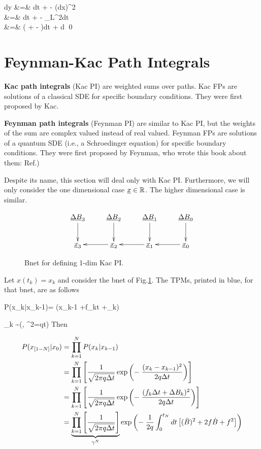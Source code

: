 \beqa
dy &=& dt + 
-\;
(dx)^2
\\
&=&
 dt + 
-\;
_{L^2dt}
\\
&=&
\left(
 +  -
\right)dt + d\rvB
\eeqa
\qed





\section{Feynman-Kac Path Integrals}

{\bf Kac path integrals} (Kac PI)
are weighted sums  over paths. Kac FPs
are solutions of a classical SDE for specific boundary conditions. They were first proposed by Kac.

{\bf Feynman path integrals} (Feynman PI) are similar to Kac PI,
but the weights of the sum are complex valued instead of real valued. Feynman FPs
are solutions of a quantum SDE (i.e., a Schroedinger equation) for specific boundary conditions. They
were first proposed by Feynman,
who  wrote this book
about them: Ref.\cite{feynman-hibbs})

Despite its name,
this section will
deal only with  Kac PI.
Furthermore, we will only
consider the
one dimensional case $\rvx\in\RR$.
The higher dimensional case
is similar.


\begin{figure}[h!]
$$
\xymatrix{
\ul{\Delta B}_3 \ar[d]
& \ul{\Delta B}_2 \ar[d]
& \ul{\Delta B}_1 \ar[d]
& \ul{\Delta B}_0\ar[d]
\\
\rvx_3
& \rvx _2 \ar[l]
& \rvx_1 \ar[l]
& \rvx_0\ar[l]
}
$$
\caption{Bnet for defining 1-dim Kac PI.}
\label{fig-1dim-kac-pi}
\end{figure}

Let $x(t_k)=x_k$ and consider the bnet
of Fig.\ref{fig-1dim-kac-pi}.
The
TPMs, printed in blue,
for that bnet, are as follows

\beq\color{blue}
P(x_k|x_{k-1})= \indi(x_{k-1}
+f_k\Delta t +\Delta\rvB_k)
\eeq

\beq \color{blue}
\Delta\rvB_k \sim \caln(, \s^2=q\Delta t)
\eeq
Then

\begin{align}
P(x_{[1- N]}|x_0)&=
\prod_{k=1}^N P(x_k|x_{k-1})
\\
&=
\prod_{k=1}^N
\left[
\frac{1}{\sqrt{2\pi q\Delta t}}
\exp\left(
-\;
\frac{(x_k-x_{k-1})^2}{2q\Delta t}
\right)
\right]
\\
&=
\prod_{k=1}^N
\left[
\frac{1}{\sqrt{2\pi q \Delta t}}
\exp\left(
-\;
\frac{(f_k\Delta t + \Delta B_k)^2}{2q\Delta t}
\right)
\right]
\\
&=
\underbrace{\prod_{k=1}^N
\left[
\frac{1}{\sqrt{2\pi q \Delta t}}
\right]}_{\gamma^N}
\exp\left(
-\;
\frac{1}
{2q}\int_0^{t_N}dt
\left[(\ddot{B})^2 +
2f\dot{B} +f^2\right]
\right)
\end{align}



